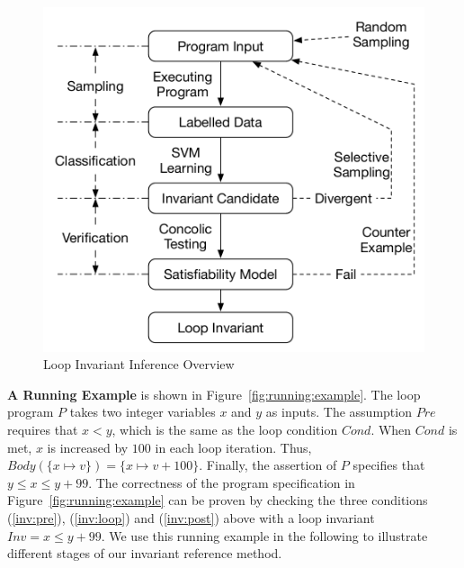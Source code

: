 \begin{figure}[t]
    \centering
    \includegraphics[scale=0.45]{figures/overview.pdf}
    \caption{Loop Invariant Inference Overview}
    \label{fig:overview}
\end{figure}

\medskip\noindent
\textbf{A Running Example}
is shown in Figure~\ref{fig:running:example}. 
The loop program $P$ takes two integer variables $x$ and $y$ as inputs. 
The assumption $\mathit{Pre}$ requires that $x < y$, 
which is the same as the loop condition $\mathit{Cond}$. 
When $\mathit{Cond}$ is met, 
$x$ is increased by $100$ in each loop iteration. 
Thus, $\mathit{Body}(\{ x \mapsto v \}) = \{ x \mapsto v + 100 \}$. 
Finally, the assertion of $P$ specifies that $y \le x \le y + 99$. 
The correctness of the program specification in Figure~\ref{fig:running:example} 
can be proven by checking the three conditions 
(\ref{inv:pre}), (\ref{inv:loop}) and (\ref{inv:post}) above 
with a loop invariant $\mathit{Inv} = x \le y + 99$. 
We use this running example in the following 
to illustrate different stages of our invariant reference method. 

